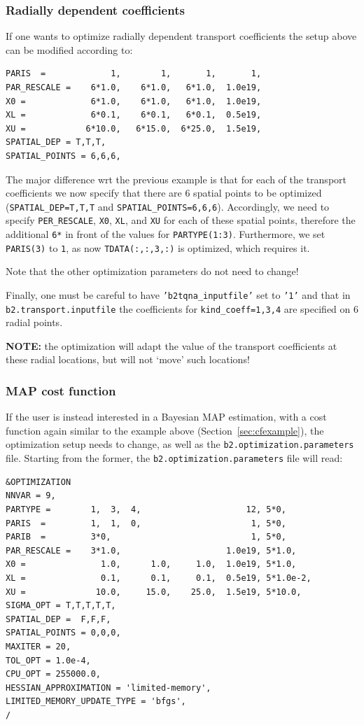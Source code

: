 \subsubsection{Radially dependent coefficients}

If one wants to optimize radially dependent transport coefficients the setup above can be modified according to:
\begin{verbatim}
PARIS  =             1,        1,       1,       1,
PAR_RESCALE =    6*1.0,    6*1.0,   6*1.0,  1.0e19,
X0 =             6*1.0,    6*1.0,   6*1.0,  1.0e19,
XL =             6*0.1,    6*0.1,   6*0.1,  0.5e19,
XU =            6*10.0,   6*15.0,  6*25.0,  1.5e19,
SPATIAL_DEP = T,T,T,
SPATIAL_POINTS = 6,6,6,
\end{verbatim}

The major difference wrt the previous example is that for each of the transport coefficients we now specify that there are 6 spatial points to be optimized ({\tt SPATIAL\_DEP=T,T,T} and {\tt SPATIAL\_POINTS=6,6,6}). Accordingly, we need to specify {\tt PER\_RESCALE}, {\tt X0}, {\tt XL}, and {\tt XU} for each of these spatial points, therefore the additional {\tt 6*} in front of the values for {\tt PARTYPE(1:3)}. Furthermore, we set {\tt PARIS(3)} to {\tt 1}, as now {\tt TDATA(:,:,3,:)} is optimized, which requires it.

Note that the other optimization parameters do not need to change!

Finally, one must be careful to have {\tt 'b2tqna\_inputfile'} set to {\tt '1'} and that in {\tt b2.transport.inputfile} the coefficients for {\tt kind\_coeff=1,3,4} are specified on 6 radial points.

\textbf{NOTE:} the optimization will adapt the value of the transport coefficients at these radial locations, but will not `move' such locations!

\subsubsection{MAP cost function}

If the user is instead interested in a Bayesian MAP estimation, with a cost function again similar to the example above (Section~\ref{sec:cfexample}), the optimization setup needs to change, as well as the {\tt b2.optimization.parameters} file. Starting from the former, the {\tt b2.optimization.parameters} file will read:
\begin{verbatim}
&OPTIMIZATION
NNVAR = 9,
PARTYPE =        1,  3,  4,                     12, 5*0,
PARIS  =         1,  1,  0,                      1, 5*0,
PARIB  =         3*0,                            1, 5*0,
PAR_RESCALE =    3*1.0,                     1.0e19, 5*1.0,
X0 =               1.0,      1.0,     1.0,  1.0e19, 5*1.0,
XL =               0.1,      0.1,     0.1,  0.5e19, 5*1.0e-2,
XU =              10.0,     15.0,    25.0,  1.5e19, 5*10.0,
SIGMA_OPT = T,T,T,T,T,
SPATIAL_DEP =  F,F,F,
SPATIAL_POINTS = 0,0,0,
MAXITER = 20,
TOL_OPT = 1.0e-4,
CPU_OPT = 255000.0,
HESSIAN_APPROXIMATION = 'limited-memory',
LIMITED_MEMORY_UPDATE_TYPE = 'bfgs',
/
\end{verbatim}

